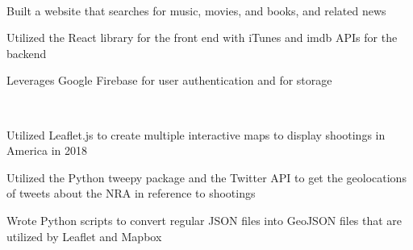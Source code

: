 \documentclass[]{deedy-resume-openfont}
\begin{document}
\begin{minipage}[t]{0.495\textwidth} 

 \\
\begin{tightemize}
\item Built a website that searches for music, movies, and books, and related news
\item Utilized the React library for the front end with iTunes and imdb APIs for the backend
\item Leverages Google Firebase for user authentication and for storage
\end{tightemize}
\sectionsep

\end{minipage} 
\hfill
\begin{minipage}[t]{0.495\textwidth} 


 \\
\begin{tightemize}
\item Utilized Leaflet.js to create multiple interactive maps to display shootings in America in 2018
\item Utilized the Python tweepy package and the Twitter API to get the geolocations of tweets about the NRA in reference to shootings
\item Wrote Python scripts to convert regular JSON files into GeoJSON files that are utilized by Leaflet and Mapbox 
\end{tightemize}
\sectionsep

\end{minipage}
\hfill
\end{document}
